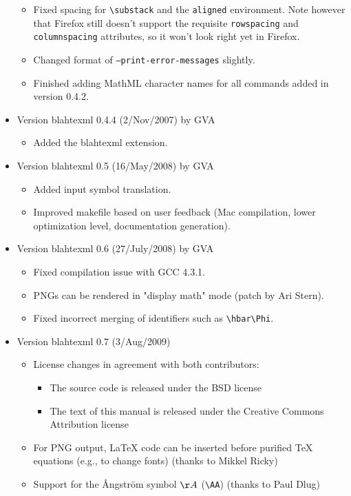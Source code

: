\documentclass{article}
\newcommand{\texcommand}[1]{\textbackslash{}#1}
\begin{document}
\begin{itemize}
\begin{itemize}
\item Fixed spacing for \texttt{\texcommand{substack}} and the \texttt{aligned} environment. Note however that Firefox still doesn't support the requisite \texttt{rowspacing} and \texttt{columnspacing} attributes, so it won't look right yet in Firefox.
\item Changed format of \texttt{--print-error-messages} slightly.
\item Finished adding MathML character names for all commands added in version 0.4.2.
\end{itemize}
\item Version blahtexml 0.4.4 (2/Nov/2007) by GVA
\begin{itemize}
\item Added the blahtexml extension.
\end{itemize}
\item Version blahtexml 0.5 (16/May/2008) by GVA
\begin{itemize}
\item Added input symbol translation.
\item Improved makefile based on user feedback (Mac compilation, lower optimization level, documentation generation).
\end{itemize}
\item Version blahtexml 0.6 (27/July/2008) by GVA
\begin{itemize}
\item Fixed compilation issue with GCC 4.3.1.
\item PNGs can be rendered in "display math" mode (patch by Ari Stern).
\item Fixed incorrect merging of identifiers such as \verb|\hbar\Phi|.
\end{itemize}
\item Version blahtexml 0.7 (3/Aug/2009)
\begin{itemize}
\item License changes in agreement with both contributors:
\begin{itemize}
\item The source code is released under the BSD license
\item The text of this manual is released under the Creative Commons Attribution license
\end{itemize}
\item For PNG output, LaTeX code can be inserted before purified TeX equations (e.g., to change fonts) (thanks to Mikkel Ricky)
\item Support for the Ångström symbol $\AA$ (\verb|\AA|) (thanks to Paul Dlug)

\end{itemize}
\end{itemize}
\end{document}
